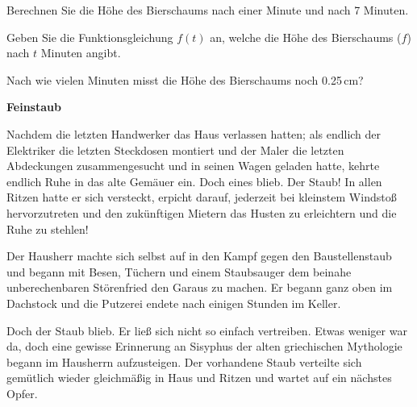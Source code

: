 \begin{bbwAufgabenBlock}
\item Berechnen Sie die Höhe des Bierschaums nach einer Minute und
  nach 7 Minuten.

  
\item Geben Sie die Funktionsgleichung $f(t)$ an, welche die Höhe
  des Bierschaums ($f$) nach $t$ Minuten angibt.

\item Nach wie vielen Minuten misst die Höhe des Bierschaums noch
  0.25\,cm?
      
\end{bbwAufgabenBlock}
\platzFuerBerechnungenBisEndeSeite{}







\bbwActAufgabenNr{} \textbf{Feinstaub}

Nachdem die letzten Handwerker das Haus verlassen hatten; als endlich der
Elektriker die letzten Steckdosen montiert und der Maler die letzten
Abdeckungen zusammengesucht und in seinen Wagen geladen hatte, kehrte
endlich Ruhe in das alte Gemäuer ein. Doch eines blieb. Der Staub!
In allen Ritzen hatte er sich versteckt, erpicht darauf,
jederzeit bei kleinstem Windstoß hervorzutreten und den zukünftigen
Mietern das Husten zu erleichtern und die Ruhe zu stehlen!

Der Hausherr machte sich selbst auf in den Kampf gegen den Baustellenstaub und
begann mit Besen, Tüchern und einem Staubsauger dem beinahe
unberechenbaren Störenfried den Garaus zu machen. Er begann ganz oben
im Dachstock und die Putzerei endete nach einigen Stunden im Keller.

Doch der Staub blieb. Er ließ sich nicht so einfach vertreiben. Etwas
weniger war da, doch eine gewisse Erinnerung an Sisyphus der alten
griechischen Mythologie begann im Hausherrn aufzusteigen. Der
vorhandene Staub verteilte sich gemütlich wieder gleichmäßig in Haus
und Ritzen und wartet auf ein nächstes Opfer.

